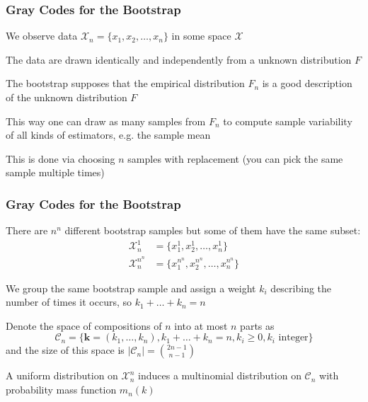 \documentclass[10pt]{beamer}
\begin{document}
\begin{frame}
\frametitle{Gray Codes for the Bootstrap}

We observe data $\mathcal{X}_n = \{ x_1, x_2, \dots, x_n \}$ in some space $\mathcal{X}$ \newline

The data are drawn identically and independently from a unknown distribution $F$ \newline

The bootstrap supposes that the empirical distribution $F_n$ is a good description of the unknown distribution $F$ \newline

This way one can draw as many samples from $F_n$ to compute sample variability of all kinds of estimators, e.g. the sample mean \newline

This is done via choosing $n$ samples with replacement (you can pick the same sample multiple times)

\end{frame}

\begin{frame}
\frametitle{Gray Codes for the Bootstrap}

There are $n^n$ different bootstrap samples but some of them have the same subset: 
\begin{align}
\mathcal{X}_n^1 & = \{ x_1^1, x_2^1, \dots, x_n^1 \} \\
\mathcal{X}_n^{n^n} & = \{ x_1^{n^n}, x_2^{n^n}, \dots, x_n^{n^n} \}
\end{align}

We group the same bootstrap sample and assign a weight $k_i$ describing the number of times it occurs, so $k_1 + \dots + k_n = n$ \newline

Denote the space of compositions of $n$ into at most $n$ parts as
\[ 
\mathcal{C}_n = \{ \boldsymbol{k} = (k_1,\dots,k_n), k_1+\dots+k_n=n, k_i \ge 0, k_i \text{ integer} \}
\]
and the size of this space is $|\mathcal{C}_n| = \binom{2n-1 }{n-1}$ \newline

A uniform distribution on $\mathcal{X}_n^n$ induces a multinomial distribution on $\mathcal{C}_n$ with probability mass function $m_n(k)$
 
\end{frame}
\end{document}
